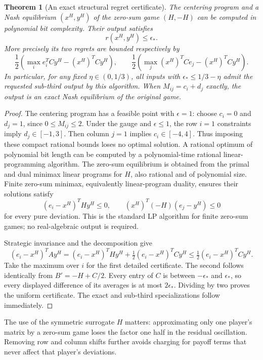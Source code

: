 \documentclass[11pt]{article}
\newtheorem{theorem}{Theorem}
\theoremstyle{definition}
\begin{document}
\begin{theorem}[An exact structural regret certificate]\label{certificate}
The centering program and a Nash equilibrium $(x^H,y^H)$ of the zero-sum
game $(H,-H)$ can be computed in polynomial bit complexity. Their output
satisfies
\[
 r(x^H,y^H)\le\epsilon_*.
\]
More precisely its two regrets are bounded respectively by
\[
 \frac12\left(\max_i e_i^TCy^H-(x^H)^TCy^H\right),\qquad
 \frac12\left(\max_j(x^H)^TCe_j-(x^H)^TCy^H\right).
\]
In particular, for any fixed $\eta\in(0,1/3)$, all inputs with
$\epsilon_*\le1/3-\eta$ admit the requested sub-third output by this
algorithm. When $M_{ij}=c_i+d_j$ exactly, the output is an exact Nash
equilibrium of the original game.
\end{theorem}
\begin{proof}
The centering program has a feasible point with $\epsilon=1$: choose
$c_i=0$ and $d_j=1$, since $0\le M_{ij}\le2$. Under the gauge and
$\epsilon\le1$, the row $i=1$ constraints imply $d_j\in[-1,3]$.
Then column $j=1$ implies $c_i\in[-4,4]$. Thus imposing these compact
rational bounds loses no optimal solution. A rational optimum of polynomial
bit length can be computed by a polynomial-time rational linear-programming
algorithm. The zero-sum equilibrium is obtained from the primal and dual
minimax linear programs for $H$, also rational and of polynomial size.
Finite zero-sum minimax, equivalently linear-program duality, ensures their
solutions satisfy
\[
 (e_i-x^H)^THy^H\le0,\qquad
 (x^H)^T(-H)(e_j-y^H)\le0
\]
for every pure deviation. This is the standard LP algorithm for finite
zero-sum games; no real-algebraic output is required.

Strategic invariance and the decomposition give
\[
 (e_i-x^H)^TAy^H
 =(e_i-x^H)^THy^H+\tfrac12(e_i-x^H)^TCy^H
 \le\tfrac12(e_i-x^H)^TCy^H.
\]
Take the maximum over $i$ for the first detailed certificate. The second
follows identically from $B'=-H+C/2$. Every entry of $C$ is between
$-\epsilon_*$ and $\epsilon_*$, so every displayed difference of its
averages is at most $2\epsilon_*$. Dividing by two proves the uniform
certificate. The exact and sub-third specializations follow immediately.
\end{proof}
The use of the symmetric surrogate $H$ matters: approximating only one
player's matrix by a zero-sum game loses the factor one half in the
residual oscillation. Removing row and column shifts further avoids
charging for payoff terms that never affect that player's deviations.
\end{document}
